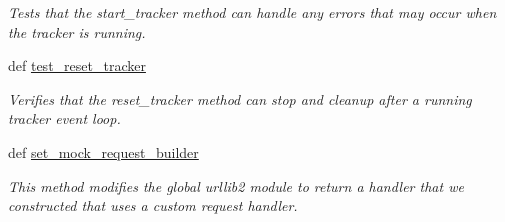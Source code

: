 \begin{DoxyCompactItemize}
\begin{DoxyCompactList}\small\item\em Tests that the start\-\_\-tracker method can handle any errors that may occur when the tracker is running. \end{DoxyCompactList}\item 
\hypertarget{classhwm_1_1hardware_1_1devices_1_1drivers_1_1mxl__balloon__tracker_1_1tests_1_1test__mxl__ballo85cb9f09344d47402c35803686488a42_a76570059fbc4668d1f00a88bde44b1b9}{def \hyperlink{classhwm_1_1hardware_1_1devices_1_1drivers_1_1mxl__balloon__tracker_1_1tests_1_1test__mxl__ballo85cb9f09344d47402c35803686488a42_a76570059fbc4668d1f00a88bde44b1b9}{test\-\_\-reset\-\_\-tracker}}\label{classhwm_1_1hardware_1_1devices_1_1drivers_1_1mxl__balloon__tracker_1_1tests_1_1test__mxl__ballo85cb9f09344d47402c35803686488a42_a76570059fbc4668d1f00a88bde44b1b9}

\begin{DoxyCompactList}\small\item\em Verifies that the reset\-\_\-tracker method can stop and cleanup after a running tracker event loop. \end{DoxyCompactList}\item 
\hypertarget{classhwm_1_1hardware_1_1devices_1_1drivers_1_1mxl__balloon__tracker_1_1tests_1_1test__mxl__ballo85cb9f09344d47402c35803686488a42_a6b8201bbc6d612312c22f3af94f0d45a}{def \hyperlink{classhwm_1_1hardware_1_1devices_1_1drivers_1_1mxl__balloon__tracker_1_1tests_1_1test__mxl__ballo85cb9f09344d47402c35803686488a42_a6b8201bbc6d612312c22f3af94f0d45a}{set\-\_\-mock\-\_\-request\-\_\-builder}}\label{classhwm_1_1hardware_1_1devices_1_1drivers_1_1mxl__balloon__tracker_1_1tests_1_1test__mxl__ballo85cb9f09344d47402c35803686488a42_a6b8201bbc6d612312c22f3af94f0d45a}

\begin{DoxyCompactList}\small\item\em This method modifies the global urllib2 module to return a handler that we constructed that uses a custom request handler. \end{DoxyCompactList}\end{DoxyCompactItemize}

